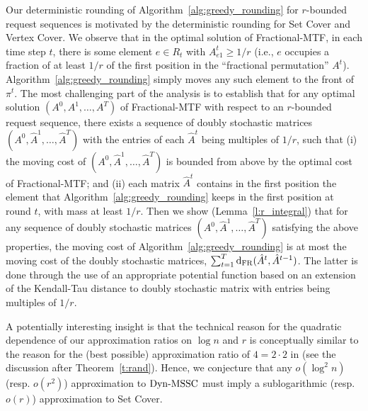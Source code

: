 Our deterministic rounding of Algorithm~\ref{alg:greedy_rounding} for $r$-bounded request sequences is motivated by the deterministic rounding for Set Cover and Vertex Cover. We observe that in the optimal solution of Fractional-MTF, in each time step $t$, there is some element $e \in R_t$ with $A^{t}_{e1} \geq 1/r$ (i.e., $e$ occupies a fraction of at least $1/r$ of the first position in the ``fractional permutation'' $A^t$). Algorithm~\ref{alg:greedy_rounding} simply moves any such element to the front of $\pi^t$. The most challenging part of the analysis is to establish that for any optimal solution $(A^0, A^1, \ldots, A^T)$ of Fractional-MTF with respect to an $r$-bounded request sequence, there exists a sequence of doubly stochastic matrices $(A^0, \hat{A}^1, \ldots, \hat{A}^T)$ with the entries of each $\hat{A}^t$ being multiples of $1/r$, such that (i) the moving cost of $(A^0, \hat{A}^1, \ldots, \hat{A}^T)$ is bounded from above by the optimal cost of Fractional-MTF; and (ii) each matrix $\hat{A}^t$ contains in the first position the element that Algorithm~\ref{alg:greedy_rounding} keeps in the first position at round $t$, with mass at least $1/r$. Then we show (Lemma~\ref{l:r_integral}) that for any sequence of doubly stochastic matrices $(A^0, \hat{A}^1, \ldots, \hat{A}^T)$ satisfying the above properties, the moving cost of Algorithm~\ref{alg:greedy_rounding} is at most the moving cost of the doubly stochastic matrices,
$\sum_{t=1}^T \mathrm{d}_{\mathrm{FR}}(\hat{A}^t,\hat{A}^{t-1})$. The latter is done through the use of an appropriate potential function based on an extension of the Kendall-Tau distance to doubly stochastic matrix with entries being multiples of $1/r$.

A potentially interesting insight %
is that the technical reason for the quadratic dependence of our approximation ratios on $\log n$ and $r$ is conceptually similar to the reason for the (best possible) approximation ratio of $4 = 2\cdot 2$ in \cite{FLT04} (see the discussion after Theorem~\ref{t:rand}). Hence, we conjecture that any $o(\log^2 n)$ (resp. $o(r^2)$) approximation to $\mathrm{Dyn}\text{-}\mathrm{MSSC}$ must imply a sublogarithmic (resp. $o(r)$) approximation to Set Cover.%


